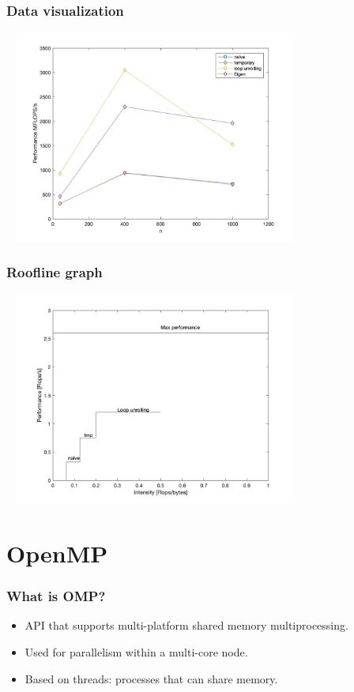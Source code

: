 \documentclass{beamer}
\begin{document}
\begin{frame}
\frametitle{Data visualization}
\includegraphics[width=10cm, height=7cm]{plotcolor}
\end{frame}

\begin{frame}
\frametitle{Roofline graph}
\includegraphics[width=10cm, height=7cm]{fig_ok}
\end{frame}


\section{OpenMP}

\begin{frame}
\frametitle{What is OMP?}
\begin{itemize}
\item API that supports multi-platform shared memory multiprocessing.
\item Used for parallelism within a multi-core node.
\item Based on threads: processes that can share memory.
\end{itemize}
\end{frame}
\end{document}
